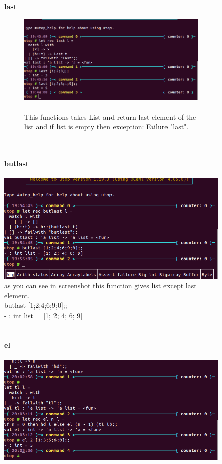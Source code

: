 \documentclass[15]{article}
\begin{document}
\begin{figure}
\textbf{last}
\begin{figure}
\includegraphics[scale = .5]{images/image10.png}
\\
\\
This functions takes List and return last element of the list
and if list is empty then exception: Failure "last".\\
\\
\end{figure}
\\
\textbf{butlast}\\
\\
\includegraphics{images/image9.png}
\\
as you can see in screenshot this function gives list except last element.\\
butlast [1;2;4;6;9;0];; \\
- : int list = [1; 2; 4; 6; 9] \\
\\
\\
\textbf{el}\\
\\
\includegraphics[scale = .5]{images/image8.png}

\end{figure}
\end{document}
